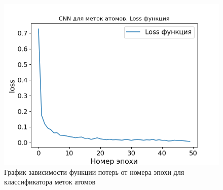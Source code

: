 \begin{figure}[h!] 
	\center
	\includegraphics [scale=0.8] {my_folder/images/atom_loss}
	\caption{График зависимости функции потерь от номера эпохи для классификатора меток атомов}
	\label{fig:AP50_atom_loss}
\end{figure}


% 

\FloatBarrier %
\NewPage

